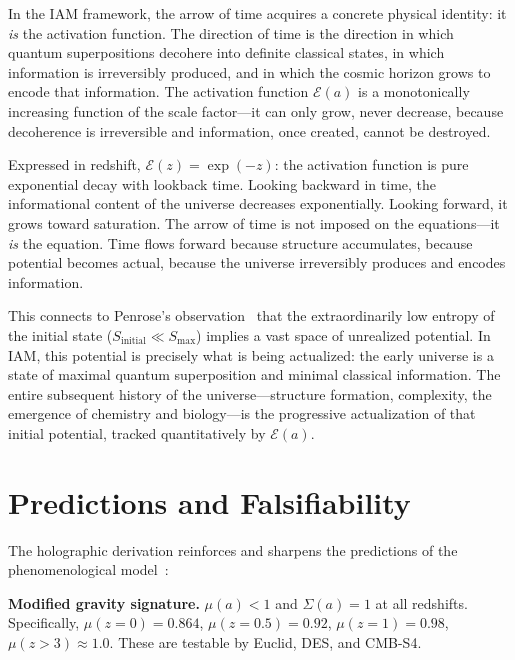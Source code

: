 \documentclass[twocolumn,superscriptaddress,prl,amsmath,amssymb]{revtex4-2}
\begin{document}
In the IAM framework, the arrow of time acquires a concrete physical identity: it \textit{is} the activation function. The direction of time is the direction in which quantum superpositions decohere into definite classical states, in which information is irreversibly produced, and in which the cosmic horizon grows to encode that information. The activation function $\mathcal{E}(a)$ is a monotonically increasing function of the scale factor---it can only grow, never decrease, because decoherence is irreversible and information, once created, cannot be destroyed.

Expressed in redshift, $\mathcal{E}(z) = \exp(-z)$: the activation function is pure exponential decay with lookback time. Looking backward in time, the informational content of the universe decreases exponentially. Looking forward, it grows toward saturation. The arrow of time is not imposed on the equations---it \textit{is} the equation. Time flows forward because structure accumulates, because potential becomes actual, because the universe irreversibly produces and encodes information.

This connects to Penrose's observation~\cite{Penrose1989} that the extraordinarily low entropy of the initial state ($S_\text{initial} \ll S_\text{max}$) implies a vast space of unrealized potential. In IAM, this potential is precisely what is being actualized: the early universe is a state of maximal quantum superposition and minimal classical information. The entire subsequent history of the universe---structure formation, complexity, the emergence of chemistry and biology---is the progressive actualization of that initial potential, tracked quantitatively by $\mathcal{E}(a)$.

\section{Predictions and Falsifiability}
\label{sec:predictions}

The holographic derivation reinforces and sharpens the predictions of the phenomenological model~\cite{Mahaffey2026main,Mahaffey2026compendium}:

\textbf{Modified gravity signature.} $\mu(a) < 1$ and $\Sigma(a) = 1$ at all redshifts. Specifically, $\mu(z=0) = 0.864$, $\mu(z=0.5) = 0.92$, $\mu(z=1) = 0.98$, $\mu(z>3) \approx 1.0$. These are testable by Euclid, DES, and CMB-S4.
\end{document}
